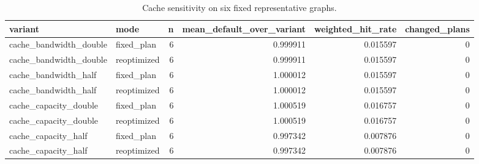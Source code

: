 \begin{table}[htbp]
\centering
\caption{Cache sensitivity on six fixed representative graphs.}
\begin{tabular}{llrrrr}
\toprule
variant & mode & n & mean\_default\_over\_variant & weighted\_hit\_rate & changed\_plans \\
\midrule
cache\_bandwidth\_double & fixed\_plan & 6 & 0.999911 & 0.015597 & 0 \\
cache\_bandwidth\_double & reoptimized & 6 & 0.999911 & 0.015597 & 0 \\
cache\_bandwidth\_half & fixed\_plan & 6 & 1.000012 & 0.015597 & 0 \\
cache\_bandwidth\_half & reoptimized & 6 & 1.000012 & 0.015597 & 0 \\
cache\_capacity\_double & fixed\_plan & 6 & 1.000519 & 0.016757 & 0 \\
cache\_capacity\_double & reoptimized & 6 & 1.000519 & 0.016757 & 0 \\
cache\_capacity\_half & fixed\_plan & 6 & 0.997342 & 0.007876 & 0 \\
cache\_capacity\_half & reoptimized & 6 & 0.997342 & 0.007876 & 0 \\
\bottomrule
\end{tabular}
\end{table}
